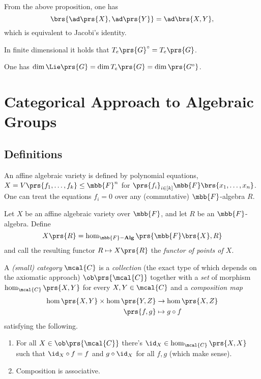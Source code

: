 \documentclass[10pt,a4paper,twoside,openany,hidelinks]{book}
\begin{document}
\begin{remark}
From the above proposition, one has
\[\brs{\ad\prs{X}, \ad\prs{Y}} = \ad\brs{X,Y} \text{,}\]
which is equivalent to Jacobi's identity.
\end{remark}

\begin{exercise}
In finite dimensional it holds that $T_e\prs{G}^\circ = T_e\prs{G}$.
\end{exercise}

\begin{corollary}
One has $\dim \Lie\prs{G} = \dim T_e\prs{G} = \dim\prs{G^\circ}$.
\end{corollary}

\section{Categorical Approach to Algebraic Groups}

\subsection{Definitions}

An affine algebraic variety is defined by polynomial equations, $X = V\prs{f_1, \ldots, f_k} \leq \mbb{F}^n$ for $\prs{f_i}_{i \in [k]} \mbb{F}\brs{x_1, \ldots, x_n}$.
One can treat the equations $f_i = 0$ over any (commutative) $\mbb{F}$-algebra $R$.

\begin{definition}
Let $X$ be an affine algebraic variety over $\mbb{F}$, and let $R$ be an $\mbb{F}$-algebra.
Define
\[X\prs{R} = \hom_{\mbb{F}\mathbf{-Alg}}\prs{\mbb{F}\brs{X}, R}\]
and call the resulting functor $R \mapsto X\prs{R}$ the \emph{functor of points of $X$}.
\end{definition}

\begin{definition}[Category]
A \emph{(small) category} $\mcal{C}$ is a \emph{collection} (the exact type of which depends on the axiomatic approach) $\ob\prs{\mcal{C}}$ together with a \emph{set} of morphism $\hom_{\mcal{C}}\prs{X,Y}$ for every $X,Y \in \mcal{C}$ and a \emph{composition map}
\begin{align*}
\hom\prs{X,Y} \times \hom\prs{Y,Z} &\to \hom\prs{X,Z} \\
\prs{f,g} &\mapsto g \circ f
\end{align*}
satisfying the following.

\begin{enumerate}
\item For all $X \in \ob\prs{\mcal{C}}$ there's $\id_X \in \hom_{\mcal{C}}\prs{X,X}$ such that $\id_X \circ f = f$ and $g \circ \id_X$ for all $f,g$ (which make sense).
\item Composition is associative.
\end{enumerate}
\end{definition}
\end{document}
